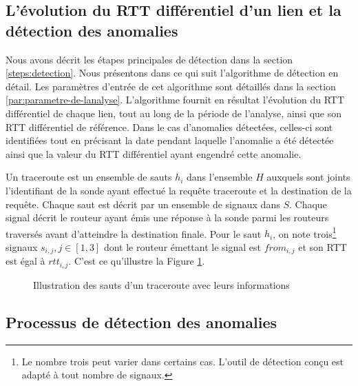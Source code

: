 \subsection{L'évolution du RTT différentiel d'un lien et  la détection des anomalies} \label{rttevolution}

Nous avons décrit les étapes principales de détection dans la section \ref{steps:detection}. Nous  présentons dans ce qui suit  l'algorithme de détection en détail. Les paramètres d'entrée  de cet algorithme sont détaillés dans la section \ref{par:parametre-de-lanalyse}. L'algorithme fournit en résultat l'évolution du RTT différentiel de chaque lien, tout au long de la période de l'analyse, ainsi que son RTT différentiel de référence. Dans le cas d'anomalies détectées, celles-ci sont identifiées tout en précisant la date pendant laquelle l'anomalie a été détectée ainsi que la valeur du RTT différentiel ayant engendré cette anomalie. 

Un traceroute  est un ensemble de sauts $h_i$ dans l'ensemble  $H$ auxquels sont joints l'identifiant de la sonde ayant effectué la requête traceroute et la destination de la requête. Chaque saut est décrit par un ensemble de signaux dans  $S$.  Chaque signal décrit le routeur ayant émis une réponse à la sonde parmi les routeurs traversés avant d'atteindre la destination finale.  Pour le saut $h_i$, on note trois\footnote{Le nombre trois peut varier dans certains cas. L'outil de détection conçu est adapté à tout nombre de signaux.} signaux $s_{i, j},  j\in [1,3]$ dont le routeur émettant le signal est $from_{i,j}$ et son RTT est égal à $rtt_{i,j}$. C'est ce qu'illustre  la Figure \ref{fig:traceroute}.

\begin{figure}[H]
	\centering
	\captionsetup{justification=centering}
	\resizebox{\textwidth}{!}{
	
}
	\caption{Illustration des sauts d'un traceroute avec leurs informations}
	\label{fig:traceroute}
\end{figure}

%	 
\subsection{Processus de  détection des anomalies }\label{steps-rtt-analysis}

